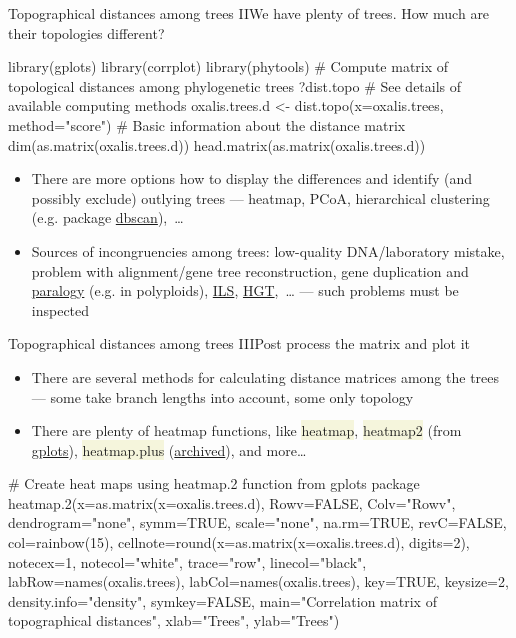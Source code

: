 \documentclass[compress, xelatex, 11pt, xcolor=svgnames, aspectratio=169, url={hyphens, lowtilde}]{beamer}
\renewcommand{\texttt}[1]{\colorbox{Beige}{{\ttfamily #1}}}
\begin{document}
\begin{frame}[fragile]{Topographical distances among trees II}{We have plenty of trees. How much are their topologies different?}
	\begin{spluscode}
    library(gplots)
    library(corrplot)
    library(phytools)
    # Compute matrix of topological distances among phylogenetic trees
    ?dist.topo # See details of available computing methods
    oxalis.trees.d <- dist.topo(x=oxalis.trees, method="score")
    # Basic information about the distance matrix
    dim(as.matrix(oxalis.trees.d))
    head.matrix(as.matrix(oxalis.trees.d))
	\end{spluscode}
	\begin{itemize}
		\item There are more options how to display the differences and identify (and possibly exclude) outlying trees --- heatmap, PCoA, hierarchical clustering (e.g. package \href{https://CRAN.R-project.org/package=dbscan}{dbscan}),~\ldots
		\item Sources of incongruencies among trees: low-quality DNA/laboratory mistake, problem with alignment/gene tree reconstruction, gene duplication and \href{https://en.wikipedia.org/wiki/Sequence_homology}{paralogy} (e.g. in polyploids), \href{https://en.wikipedia.org/wiki/Incomplete_lineage_sorting}{ILS}, \href{https://en.wikipedia.org/wiki/Horizontal_gene_transfer}{HGT},~\ldots{ } --- such problems must be inspected
	\end{itemize}
\end{frame}

\begin{frame}[fragile]{Topographical distances among trees III}{Post process the matrix and plot it}
	\begin{itemize}
		\item There are several methods for calculating distance matrices among the trees --- some take branch lengths into account, some only topology
		\item There are plenty of heatmap functions, like \texttt{heatmap}, \texttt{heatmap2} (from \href{https://cran.r-project.org/package=gplots}{gplots}), \texttt{heatmap.plus} (\href{https://cran.r-project.org/package=heatmap.plus}{archived}), and more\ldots
	\end{itemize}
	\begin{spluscode}
    # Create heat maps using heatmap.2 function from gplots package
    heatmap.2(x=as.matrix(x=oxalis.trees.d), Rowv=FALSE, Colv="Rowv",
      dendrogram="none", symm=TRUE, scale="none", na.rm=TRUE, revC=FALSE,
      col=rainbow(15), cellnote=round(x=as.matrix(x=oxalis.trees.d), digits=2),
      notecex=1, notecol="white", trace="row", linecol="black",
      labRow=names(oxalis.trees), labCol=names(oxalis.trees), key=TRUE,
      keysize=2, density.info="density", symkey=FALSE, main="Correlation
      matrix of topographical distances", xlab="Trees", ylab="Trees")
	\end{spluscode}
\end{frame}
\end{document}

